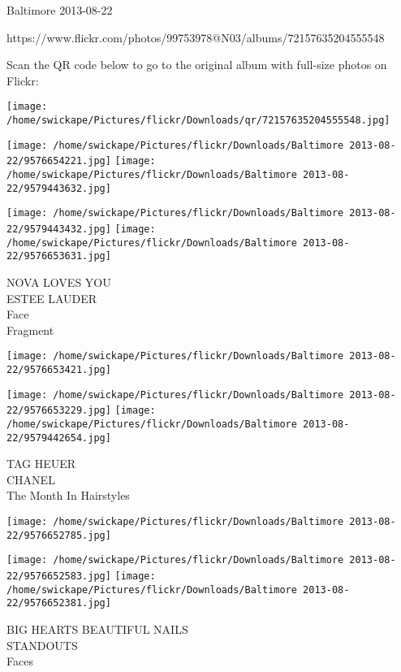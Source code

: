 \documentclass[10pt,letterpaper]{article}
\begin{document}
Baltimore 2013-08-22

https://www.flickr.com/photos/99753978@N03/albums/72157635204555548

Scan the QR code below to go to the original album with full-size photos on Flickr:

\texttt{[image: /home/swickape/Pictures/flickr/Downloads/qr/72157635204555548.jpg]}
\pagebreak

\texttt{[image: /home/swickape/Pictures/flickr/Downloads/Baltimore 2013-08-22/9576654221.jpg]}
\texttt{[image: /home/swickape/Pictures/flickr/Downloads/Baltimore 2013-08-22/9579443632.jpg]}

\texttt{[image: /home/swickape/Pictures/flickr/Downloads/Baltimore 2013-08-22/9579443432.jpg]}
\texttt{[image: /home/swickape/Pictures/flickr/Downloads/Baltimore 2013-08-22/9576653631.jpg]}

NOVA LOVES YOU\\
ESTEE LAUDER\\
Face\\
Fragment\\
\pagebreak

\texttt{[image: /home/swickape/Pictures/flickr/Downloads/Baltimore 2013-08-22/9576653421.jpg]}

\vspace{0.25in}
\texttt{[image: /home/swickape/Pictures/flickr/Downloads/Baltimore 2013-08-22/9576653229.jpg]}
\texttt{[image: /home/swickape/Pictures/flickr/Downloads/Baltimore 2013-08-22/9579442654.jpg]}

TAG HEUER\\
CHANEL\\
The Month In Hairstyles\\
\pagebreak

\texttt{[image: /home/swickape/Pictures/flickr/Downloads/Baltimore 2013-08-22/9576652785.jpg]}

\vspace{0.25in}
\texttt{[image: /home/swickape/Pictures/flickr/Downloads/Baltimore 2013-08-22/9576652583.jpg]}
\texttt{[image: /home/swickape/Pictures/flickr/Downloads/Baltimore 2013-08-22/9576652381.jpg]}

BIG HEARTS BEAUTIFUL NAILS\\
STANDOUTS\\
Faces\\
\pagebreak
\end{document}
